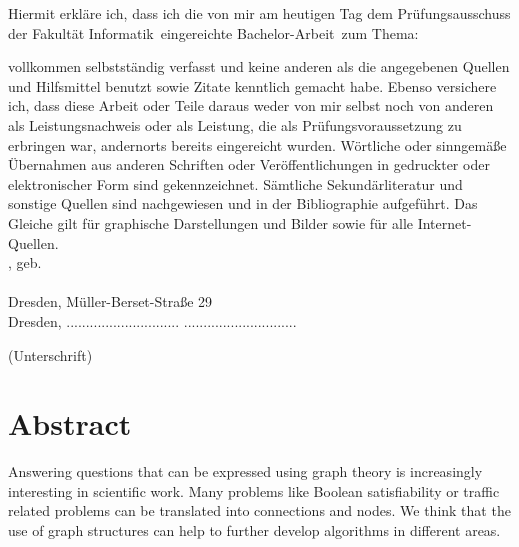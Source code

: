 \documentclass[a4paper, 12pt, bibliography=totoc]{scrartcl}
\begin{document}
\noindent
 Hiermit erkl\"{a}re ich, dass ich die von mir am heutigen Tag dem Pr\"{u}fungsausschuss der Fakult\"{a}t Informatik~eingereichte Bachelor-Arbeit~zum Thema:
\begin{center}
	\textit{\mytitle}
\end{center}

vollkommen selbstst\"{a}ndig verfasst und keine anderen als die angegebenen Quellen und Hilfsmittel benutzt sowie Zitate kenntlich gemacht habe. Ebenso versichere ich, dass diese Arbeit
oder Teile daraus weder von mir selbst noch von anderen als Leistungsnachweis oder als Leistung, die als Prüfungsvoraussetzung
zu erbringen war, andernorts bereits eingereicht wurden. Wörtliche oder sinngemäße Übernahmen aus anderen Schriften
oder Veröffentlichungen in gedruckter oder elektronischer Form sind gekennzeichnet.
Sämtliche Sekundärliteratur und sonstige Quellen sind nachgewiesen und in der Bibliographie aufgeführt.
Das Gleiche gilt für graphische Darstellungen und Bilder sowie für alle Internet-Quellen. \\[20pt]

\noindent
\myauthor, geb. \mybirthday \\\\
 Dresden, Müller-Berset-Straße 29\\[80pt]


Dresden,  ............................. \hfill .............................
\begin{flushright}
	(Unterschrift)\hspace{1em}
\end{flushright}


\newpage

\section*{Abstract}
\vspace{4ex}

Answering questions that can be expressed using graph theory is increasingly interesting in scientific work.
Many problems like Boolean satisfiability or traffic related problems can be translated into connections and nodes.
We think that the use of graph structures can help to further develop algorithms in different areas.
\end{document}
